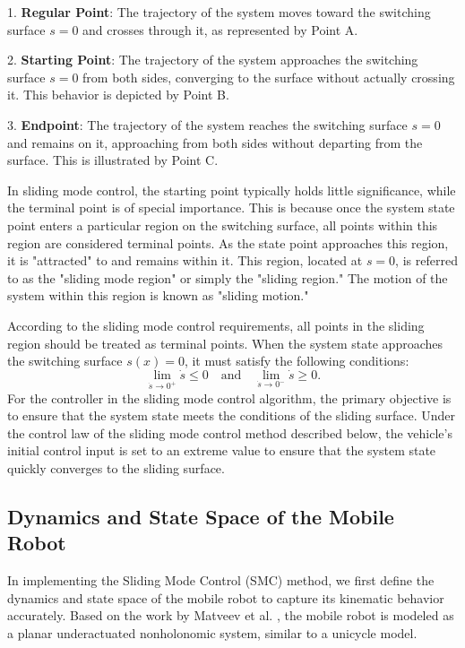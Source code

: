 1. \textbf{Regular Point}: The trajectory of the system moves toward the switching surface \( s = 0 \) and crosses through it, as represented by Point A.

2. \textbf{Starting Point}: The trajectory of the system approaches the switching surface \( s = 0 \) from both sides, converging to the surface without actually crossing it. This behavior is depicted by Point B.

3. \textbf{Endpoint}: The trajectory of the system reaches the switching surface \( s = 0 \) and remains on it, approaching from both sides without departing from the surface. This is illustrated by Point C.

    In sliding mode control, the starting point typically holds little significance, while the terminal point is of special importance. This is because once the system state point enters a particular region on the switching surface, all points within this region are considered terminal points. As the state point approaches this region, it is "attracted" to and remains within it. This region, located at \( s=0 \), is referred to as the "sliding mode region" or simply the "sliding region." The motion of the system within this region is known as "sliding motion."

 According to the sliding mode control requirements, all points in the sliding region should be treated as terminal points. When the system state approaches the switching surface \( s(x) = 0 \), it must satisfy the following conditions:
\begin{equation}
\lim_{\dot{s} \to 0^+} \dot{s} \leq 0 \quad \text{and} \quad \lim_{\dot{s} \to 0^-} \dot{s} \geq 0.
\label{eq:sliding_conditions}
\end{equation}
 For the controller in the sliding mode control algorithm, the primary objective is to ensure that the system state meets the conditions of the sliding surface. Under the control law of the sliding mode control method described below, the vehicle's initial control input is set to an extreme value to ensure that the system state quickly converges to the sliding surface.

\subsection{Dynamics and State Space of the Mobile Robot}

In implementing the Sliding Mode Control (SMC) method, we first define the dynamics and state space of the mobile robot to capture its kinematic behavior accurately. Based on the work by Matveev et al. \cite{Matveev2012}, the mobile robot is modeled as a planar underactuated nonholonomic system, similar to a unicycle model.


